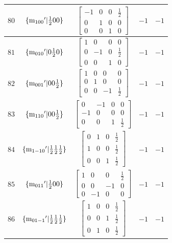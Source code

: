 \documentclass[fleqn,8pt]{jsarticle}
\begin{document}
\begin{longtable}{ccccc}
$ 80 $ & $ \{{\rm m}_{100}{}'|\frac{1}{2} 0 0\} $ & $ \begin{bmatrix} -1 & 0 & 0 & \frac{1}{2} \\ 0 & 1 & 0 & 0 \\ 0 & 0 & 1 & 0 \end{bmatrix} $ & $ -1 $ & $ -1 $ \\ \hline
$ 81 $ & $ \{{\rm m}_{010}{}'|0 \frac{1}{2} 0\} $ & $ \begin{bmatrix} 1 & 0 & 0 & 0 \\ 0 & -1 & 0 & \frac{1}{2} \\ 0 & 0 & 1 & 0 \end{bmatrix} $ & $ -1 $ & $ -1 $ \\ \hline
$ 82 $ & $ \{{\rm m}_{001}{}'|0 0 \frac{1}{2}\} $ & $ \begin{bmatrix} 1 & 0 & 0 & 0 \\ 0 & 1 & 0 & 0 \\ 0 & 0 & -1 & \frac{1}{2} \end{bmatrix} $ & $ -1 $ & $ -1 $ \\ \hline
$ 83 $ & $ \{{\rm m}_{110}{}'|0 0 \frac{1}{2}\} $ & $ \begin{bmatrix} 0 & -1 & 0 & 0 \\ -1 & 0 & 0 & 0 \\ 0 & 0 & 1 & \frac{1}{2} \end{bmatrix} $ & $ -1 $ & $ -1 $ \\ \hline
$ 84 $ & $ \{{\rm m}_{1-10}{}'|\frac{1}{2} \frac{1}{2} \frac{1}{2}\} $ & $ \begin{bmatrix} 0 & 1 & 0 & \frac{1}{2} \\ 1 & 0 & 0 & \frac{1}{2} \\ 0 & 0 & 1 & \frac{1}{2} \end{bmatrix} $ & $ -1 $ & $ -1 $ \\ \hline
$ 85 $ & $ \{{\rm m}_{011}{}'|\frac{1}{2} 0 0\} $ & $ \begin{bmatrix} 1 & 0 & 0 & \frac{1}{2} \\ 0 & 0 & -1 & 0 \\ 0 & -1 & 0 & 0 \end{bmatrix} $ & $ -1 $ & $ -1 $ \\ \hline
$ 86 $ & $ \{{\rm m}_{01-1}{}'|\frac{1}{2} \frac{1}{2} \frac{1}{2}\} $ & $ \begin{bmatrix} 1 & 0 & 0 & \frac{1}{2} \\ 0 & 0 & 1 & \frac{1}{2} \\ 0 & 1 & 0 & \frac{1}{2} \end{bmatrix} $ & $ -1 $ & $ -1 $ \\ \hline

\end{longtable}
\end{document}
